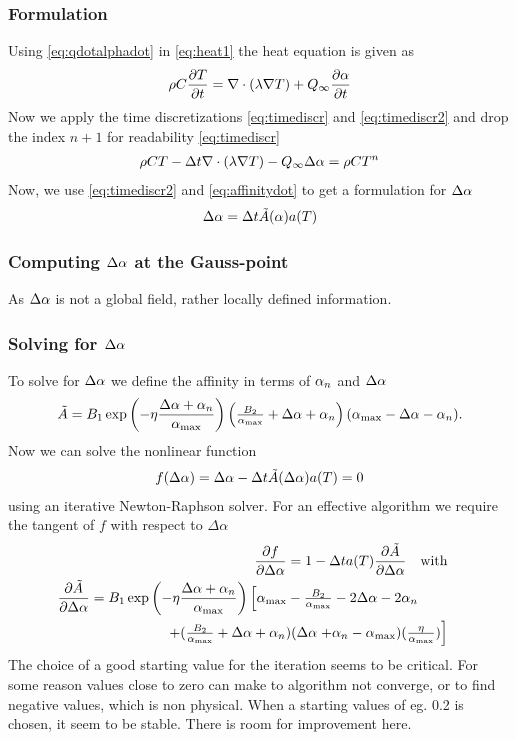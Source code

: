 \subsubsection{Formulation}
Using \eqref{eq:qdotalphadot} in \eqref{eq:heat1}
the heat equation is given as
\begin{align}
	\rho C \frac{\partial T}{\partial t} = \nabla \cdot (\lambda \nabla T) + Q_{\infty}\frac{\partial  \alpha}{\partial t} 
\end{align}
Now we apply the time discretizations \eqref{eq:timediscr} and \eqref{eq:timediscr2} and drop the index $n+1$ for readability \eqref{eq:timediscr}
\begin{align}
	\rho C T  - {\Delta t} \nabla \cdot (\lambda \nabla T) - Q_{\infty}\Delta \alpha
	= \rho C T^{n}   \label{eq:heat2}
\end{align}
Now, we use \eqref{eq:timediscr2} and \eqref{eq:affinitydot} to get a formulation for $\Delta \alpha$
\begin{align}
	\Delta \alpha = \Delta t \tilde{A}( \alpha)a(T) \label{eq:deltaalpha}
\end{align}
\subsubsection{Computing $\Delta \alpha$ at the Gauss-point}
As $\Delta \alpha$ is not a global field, rather locally defined information.
\subsubsection{Solving for $\Delta \alpha$}
To solve for $\Delta \alpha$ we define the affinity in terms of $ \alpha_n$ and $\Delta \alpha$
\begin{align}
	\tilde{A} = B_1\exp\left(-\eta \frac{\Delta \alpha+\alpha_n}{\alpha_{\text{max}}}\right) \left(\tfrac{B_2}{\alpha_{\text{max}}} + \Delta\alpha+\alpha_n\right) (\alpha_{\text{max}} - \Delta\alpha - \alpha_n).
\end{align}
Now we can solve the nonlinear function 
\begin{align}
	f(\Delta\alpha) = \Delta\alpha - \Delta t \tilde{A}(\Delta\alpha)a(T) = 0
\end{align}
using an iterative Newton-Raphson solver. For an effective algorithm we require the tangent of $f$ with respect to $\Delta\alpha$
\begin{align}
	\dfrac{\partial f}{\partial \Delta\alpha} = 1 - \Delta t a(T) \dfrac{\partial\tilde{A}}{\partial \Delta\alpha} \quad\text{with}\\
	\dfrac{\partial\tilde{A}}{\partial \Delta\alpha} = B_1\exp\left(-\eta \frac{\Delta\alpha+\alpha_n}{\alpha_{\text{max}}}\right)\left[
	\alpha_{\text{max}} - \tfrac{B_2}{\alpha_{\text{max}}} - 2\Delta\alpha - 2 \alpha_n\right.\quad\quad&\nonumber\\
	+ (\tfrac{B_2}{\alpha_{\text{max}}} + \Delta\alpha+\alpha_n)(\Delta\alpha\left.+ \alpha_n - \alpha_{\text{max}})(\tfrac{\eta}{\alpha_{\text{max}}})\right]&
\end{align}
The choice of a good starting value for the iteration seems to be critical.
For some reason values close to zero can make to algorithm not converge, or to find negative values, which is non physical.
When a starting values of eg. 0.2 is chosen, it seem to be stable.
There is room for improvement here.

